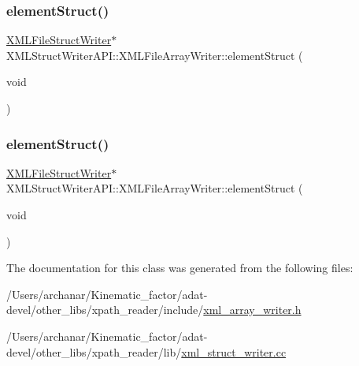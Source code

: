 \subsubsection{\texorpdfstring{elementStruct()}{elementStruct()}\hspace{0.1cm}{\footnotesize\ttfamily [2/3]}}
{\footnotesize\ttfamily \mbox{\hyperlink{classXMLStructWriterAPI_1_1XMLFileStructWriter}{X\+M\+L\+File\+Struct\+Writer}}$\ast$ X\+M\+L\+Struct\+Writer\+A\+P\+I\+::\+X\+M\+L\+File\+Array\+Writer\+::element\+Struct (\begin{DoxyParamCaption}\item[{void}]{ }\end{DoxyParamCaption})}

\mbox{\label{classXMLStructWriterAPI_1_1XMLFileArrayWriter_a53910cfce30307c3333d553b7f018e64}} 
\subsubsection{\texorpdfstring{elementStruct()}{elementStruct()}\hspace{0.1cm}{\footnotesize\ttfamily [3/3]}}
{\footnotesize\ttfamily \mbox{\hyperlink{classXMLStructWriterAPI_1_1XMLFileStructWriter}{X\+M\+L\+File\+Struct\+Writer}}$\ast$ X\+M\+L\+Struct\+Writer\+A\+P\+I\+::\+X\+M\+L\+File\+Array\+Writer\+::element\+Struct (\begin{DoxyParamCaption}\item[{void}]{ }\end{DoxyParamCaption})}



The documentation for this class was generated from the following files\+:\begin{DoxyCompactItemize}
\item 
/\+Users/archanar/\+Kinematic\+\_\+factor/adat-\/devel/other\+\_\+libs/xpath\+\_\+reader/include/\mbox{\hyperlink{adat-devel_2other__libs_2xpath__reader_2include_2xml__array__writer_8h}{xml\+\_\+array\+\_\+writer.\+h}}\item 
/\+Users/archanar/\+Kinematic\+\_\+factor/adat-\/devel/other\+\_\+libs/xpath\+\_\+reader/lib/\mbox{\hyperlink{adat-devel_2other__libs_2xpath__reader_2lib_2xml__struct__writer_8cc}{xml\+\_\+struct\+\_\+writer.\+cc}}\end{DoxyCompactItemize}
